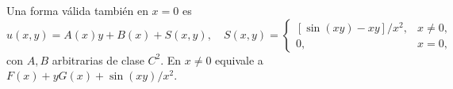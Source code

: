 Una forma válida también en $x=0$ es \[u(x,y)=A(x)y+B(x)+S(x,y),\quad S(x,y)=\begin{cases}[\sin(xy)-xy]/x^2,&x\ne0,\\0,&x=0,\end{cases}\] con $A,B$ arbitrarias de clase $C^2$. En $x\ne0$ equivale a $F(x)+yG(x)+\sin(xy)/x^2$.
